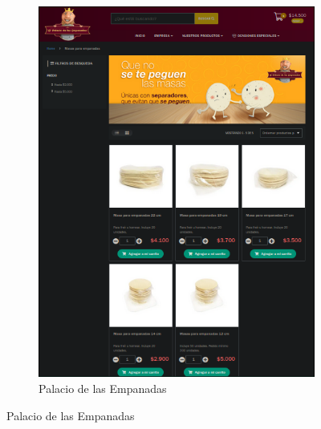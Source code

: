 \documentclass[12pt]{article}
\begin{document}
\begin{figure}[h]
    \begin{subfigure}{0.28\textwidth}
        \centering
        \includegraphics[width=0.95\linewidth]{palacio} %
        \caption{Palacio de las Empanadas}
        \label{fig:palacio}
        

\end{subfigure}
\end{figure}
\end{document}
